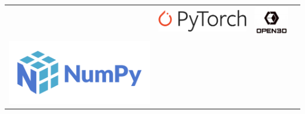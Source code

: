 \begin{frame}
\begin{table}[htp]
\begin{tabular}{cccc}
\begin{minipage}{.2\textwidth}
        \end{minipage} 
                                  & 
        \begin{minipage}{.2\textwidth}
          \includegraphics[width=\textwidth]{imagenes/chapter3/Pytorch}
        \end{minipage} 
                                  &
        \begin{minipage}{.2\textwidth}
          \includegraphics[width=.9\textwidth]{imagenes/chapter3/Open3D}
        \end{minipage} 
                                  \\
        \begin{minipage}{.2\textwidth}
          \includegraphics[width=\textwidth]{imagenes/chapter3/Numpy}

\end{minipage}
\end{tabular}
\end{table}
\end{frame}
